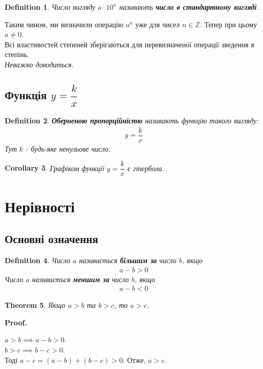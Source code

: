 \documentclass[a4paper, 10pt]{article}
\makeatletter
\def\qed{$\blacksquare$}
\theoremstyle{theoremdd}
\newtheorem{theorem}{Theorem}[subsection]
\theoremstyle{theoremdd}
\newtheorem{definition}[theorem]{Definition}
\theoremstyle{theoremdd}
\theoremstyle{theoremdd}
\theoremstyle{theoremdd}
\theoremstyle{theoremdd}
\theoremstyle{theoremdd}
\theoremstyle{theoremdd}
\newtheorem{corollary}[theorem]{Corollary}
\renewenvironment{proof}[1][Proof.\\]{\par
\pushQED{\hfill \qed}%
\normalfont \topsep6\p@\@plus6\p@\relax
\trivlist
\item\relax
{\bfseries
#1\@addpunct{.}}\hspace\labelsep\ignorespaces
}{%
\popQED\endtrivlist\@endpefalse
}
\makeatother
\begin{document}
\begin{definition}
Число вигляду $a \cdot 10^n$ називають \textbf{число в стандартному вигляді}.
\end{definition}

Таким чином, ми визначили операцію $a^n$ уже для чисел $n \in \mathbb{Z}$. Тепер при цьому $a \neq 0$.\\
Всі властивостей степеней зберігаються для перевизначеної операції зведення в степінь.\\
\textit{Неважко доводиться.}

\subsection{Функція $y = \dfrac{k}{x}$}
\begin{definition}
\textbf{Оберненою пропорційністю} називають функцію такого вигляду:
\begin{align*}
y = \dfrac{k}{x}
\end{align*}
Тут $k$ - будь-яке ненульове число.
\end{definition}

\begin{corollary}
Графіком функції $y = \dfrac{k}{x}$ є гіпербола.
\end{corollary}
\newpage

\section{Нерівності}
\subsection{Основні означення}
\begin{definition}
Число $a$ називається \textbf{більшим за} число $b$, якщо
\begin{align*}
a-b > 0
\end{align*}
Число $a$ називається \textbf{меншим за} число $b$, якщо
\begin{align*}
a-b < 0
\end{align*}
\end{definition}

\begin{theorem}
Якщо $a>b$ та $b>c$, то $a>c$.
\end{theorem}

\begin{proof}
$a>b \implies a-b>0$.\\
$b>c \implies b-c>0$.\\
Тоді $a-c = (a-b) + (b-c)>0$. Отже, $a>c$.
\end{proof}
\end{document}

